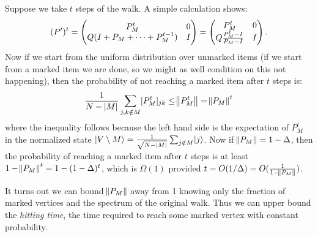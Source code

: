 Suppose we take $t$ steps of the walk. A simple calculation shows:
\begin{equation}
    (P')^t = \begin{pmatrix}P^t_M & 0 \\ Q(I + P_M + \cdots + P_M^{t-1}) & I\end{pmatrix} = \begin{pmatrix}P^t_M & 0 \\ Q\frac{P^t_M - I}{P_M - I} & I\end{pmatrix}.
\end{equation}
Now if we start from the uniform distribution over unmarked items (if we start from a marked item we are done, so we might as well condition on this not happening), then the probability of not reaching a marked item after $t$ steps is:
\begin{equation}
    \frac{1}{N-\lvert M \rvert}\sum_{j, k \notin M}[P^t_M]_{jk} \leq \norm{P^t_M} = \norm{P_M}^t
\end{equation}
where the inequality follows because the left hand side is the expectation of $P^t_M$ in the normalized state $\lvert V \setminus M \rangle = \frac{1}{\sqrt{N-\lvert M \rvert}}\sum_{j \notin M}\lvert j \rangle$. Now if $\norm{P_M} = 1 - \Delta$, then the probability of reaching a marked item after $t$ steps is at least $1 - \norm{P_M}^t = 1 - (1 - \Delta)^t$, which is $\Omega(1)$ provided $t = O(1/\Delta) = O(\frac{1}{1 - \norm{P_M}})$. 

It turns out we can bound $\norm{P_M}$ away from 1  knowing only the fraction of marked vertices and the spectrum of the original walk. Thus we can upper bound the \emph{hitting time}, the time required to reach some marked vertex with constant probability.

